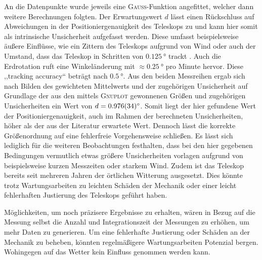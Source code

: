     An die Datenpunkte wurde jeweils eine \textsc{Gauß}-Funktion angefittet, welcher dann weitere Berechnungen folgten.
    Der Erwartungswert $d$ lässt einen Rückschluss auf Abweichungen in der Positioniergenauigkeit des Teleskops zu und kann hier somit als intrinsische Unsicherheit aufgefasst werden.
    Diese umfasst beispielsweise äußere Einflüsse, wie ein Zittern des Teleskops aufgrund von Wind oder auch der Umstand, dass das Teleskop in Schritten von $\SI{0.125}{\degree}$ trackt \cite{Usermanual}. Auch die Erdrotation ruft eine Winkeländerung mit $\approx \SI{0.25}{\degree}$ pro Minute hervor.
    Diese ,,tracking accuracy`` beträgt nach \cite{Usermanual} $\SI{0.5}{\degree}$. 
    Aus den beiden Messreihen ergab sich nach Bilden des gewichteten Mittelwerts und der zugehörigen Unsicherheit auf Grundlage der aus den mittels \textsc{Gnuplot} gewonnenen Größen und zugehörigen Unsicherheiten ein Wert von $d = \SI{0.976 \pm 0.034}{\degree}$.
    Somit liegt der hier gefundene Wert der Positioniergenauigkeit, auch im Rahmen der berechneten Unsicherheiten, höher als der aus der Literatur erwartete Wert. 
    Dennoch lässt die korrekte Größenordnung auf eine fehlerfreie Vorgehensweise schließen.
    Es lässt sich lediglich für die weiteren Beobachtungen festhalten, dass bei den hier gegebenen Bedingungen vermutlich etwas größere Unsicherheiten vorlagen aufgrund von beispielsweise kurzen Messzeiten oder starkem Wind. 
    Zudem ist das Teleskop bereits seit mehreren Jahren der örtlichen Witterung ausgesetzt.
    Dies könnte trotz Wartungsarbeiten zu leichten Schäden der Mechanik oder einer leicht fehlerhaften Justierung des Teleskops geführt haben.
    
    Möglichkeiten, um noch präzisere Ergebnisse zu erhalten, wären in Bezug auf die Messung selbst die Anzahl und Integrationszeit der Messungen zu erhöhen, um mehr Daten zu generieren. Um eine fehlerhafte Justierung oder Schäden an der Mechanik zu beheben, könnten regelmäßigere Wartungsarbeiten Potenzial bergen. Wohingegen auf das Wetter kein Einfluss genommen werden kann.\\ 



